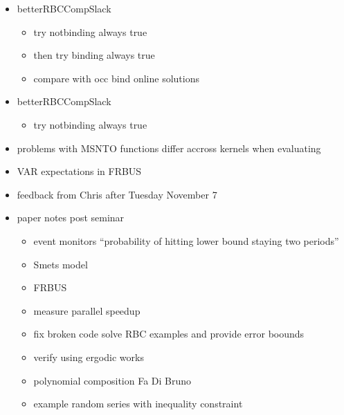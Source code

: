\documentclass[hyperref]{labbook}
\begin{document}

\begin{itemize}
\item betterRBCCompSlack
  \begin{itemize}
  \item try notbinding always true
  \item then try binding always true
  \item compare with occ bind online solutions
  \end{itemize}
\end{itemize}


\begin{itemize}
\item betterRBCCompSlack
  \begin{itemize}
  \item try notbinding always true
  \end{itemize}
\end{itemize}

\begin{itemize}
\item problems with MSNTO  functions differ accross kernels when evaluating
\end{itemize}




\begin{itemize}
\item VAR expectations in FRBUS
\item feedback from Chris after Tuesday November 7
\item paper notes post seminar
  \begin{itemize}
  \item event monitors 
``probability of hitting lower bound staying two periods''
  \item Smets model
  \item FRBUS
  \item measure parallel speedup
  \item fix broken code solve RBC examples and provide error boounds
  \item verify using ergodic works
  \item polynomial composition Fa Di Bruno
  \item example random series with inequality constraint
  \end{itemize}

\end{itemize}
\end{document}
